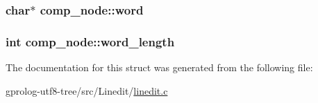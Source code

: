 \subsubsection[{\texorpdfstring{word}{word}}]{\setlength{\rightskip}{0pt plus 5cm}char$\ast$ comp\+\_\+node\+::word}\hypertarget{structcomp__node_a087b822f301956dd57ff59bf5d9ce9a4}{}\label{structcomp__node_a087b822f301956dd57ff59bf5d9ce9a4}
\subsubsection[{\texorpdfstring{word\+\_\+length}{word_length}}]{\setlength{\rightskip}{0pt plus 5cm}int comp\+\_\+node\+::word\+\_\+length}\hypertarget{structcomp__node_ab0e205b1c196f493851ae425e904c59b}{}\label{structcomp__node_ab0e205b1c196f493851ae425e904c59b}


The documentation for this struct was generated from the following file\+:\begin{DoxyCompactItemize}
\item 
gprolog-\/utf8-\/tree/src/\+Linedit/\hyperlink{linedit_8c}{linedit.\+c}\end{DoxyCompactItemize}
